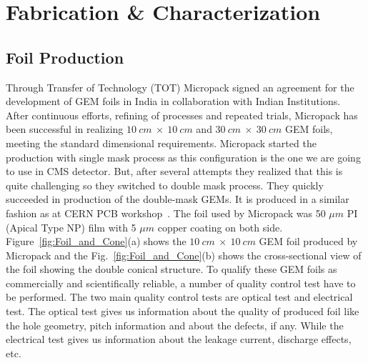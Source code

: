 \section{Fabrication \& Characterization} %
\label{sec:fabrication_&_characterization}
\subsection{Foil Production}
Through Transfer of Technology (TOT) Micropack signed an agreement for the development of GEM foils in India in collaboration with Indian Institutions. After continuous efforts, refining of processes and repeated trials, Micropack has been successful in realizing $10~cm~\times~10~cm$ and $30~cm~\times~30~cm$ GEM foils, meeting the standard dimensional requirements.
Micropack started the production with single mask process as this configuration is the one we are going to use in CMS detector. But, after several attempts they realized that this is quite challenging so they switched to double mask process. They quickly succeeded in production of the double-mask GEMs.
It is produced in a similar fashion as at CERN PCB workshop~\cite{DEOLIVEIRA2009}. The foil used by Micropack was 50 $\mu m$ PI (Apical Type NP) film with 5 $\mu m$ copper coating on both side. Figure~\ref{fig:Foil_and_Cone}(a) shows the $10~cm~\times~10~cm$ GEM foil produced by Micropack and the Fig.~\ref{fig:Foil_and_Cone}(b) shows the cross-sectional view of the foil showing the double conical structure.
To qualify these GEM foils as commercially and scientifically reliable, a number of quality control test have to be performed. The two main quality control tests are optical test and electrical test. The optical test gives us information about the quality of produced foil like the hole geometry, pitch information and about the defects, if any. While the electrical test gives us information about the leakage current, discharge effects, etc.
